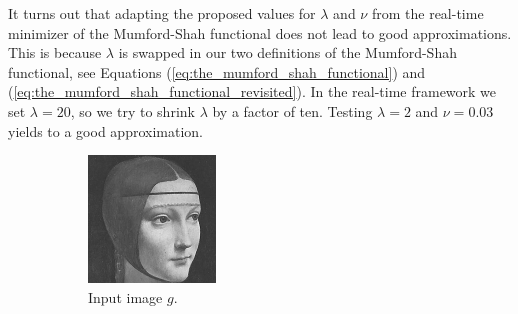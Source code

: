 \documentclass[abstracton]{scrreprt}
\begin{document}
            It turns out that adapting the proposed values for $\lambda$ and $\nu$ from the real-time minimizer of the Mumford-Shah functional does not lead to good approximations. This is because $\lambda$ is swapped in our two definitions of the Mumford-Shah functional, see Equations (\ref{eq:the_mumford_shah_functional}) and (\ref{eq:the_mumford_shah_functional_revisited}). In the real-time framework we set $\lambda = 20$, so we try to shrink $\lambda$ by a factor of ten. Testing $\lambda = 2$ and $\nu = 0.03$ yields to a good approximation.
            \begin{figure}[!ht]
                \centering
                \begin{subfigure}[b]{0.24\textwidth}
                    \includegraphics[width=\textwidth]{img/images/ladama.png}
                    \caption{Input image $g$.}
                \end{subfigure}
                \begin{subfigure}[b]{0.24\textwidth}

\end{subfigure}
\end{figure}
\end{document}
